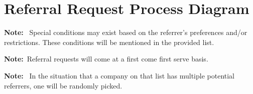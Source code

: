 \documentclass[letterpaper, 12pt]{article}
\newcommand{\note}[1]{\textbf{Note:}~#1}
\begin{document}
\section{Referral Request Process Diagram}

\label{fig:requestProcess}

\note{%
    Special conditions may exist based on the referrer's preferences and/or
    restrictions. These conditions will be mentioned in the provided list.
}

\note{Referral requests will come at a first come first serve basis.}

\note{%
    In the situation that a company on that list has multiple potential
    referrers, one will be randomly picked.
}
\end{document}
